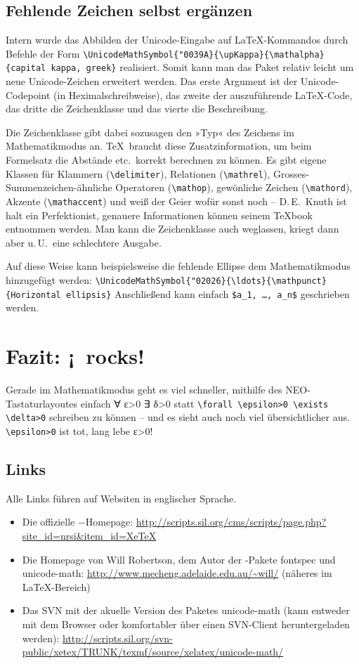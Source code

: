 ﻿\documentclass{scrartcl}
\begin{document}
\subsection{Fehlende Zeichen selbst ergänzen}
Intern wurde das Abbilden der Unicode-Eingabe auf \LaTeX-Kommandos durch Befehle der Form
\verb|\UnicodeMathSymbol{"0039A}{\upKappa}{\mathalpha}{capital kappa, greek}|
realisiert. Somit kann man das Paket relativ leicht um neue Unicode-Zeichen erweitert werden. Das erste Argument ist der Unicode-Codepoint (in Heximalschreibweise), das zweite der auszuführende \LaTeX-Code, das dritte die Zeichenklasse und das vierte die Beschreibung.

Die Zeichenklasse gibt dabei sozusagen den »Typ« des Zeichens im Mathematikmodus an. \TeX\ braucht diese Zusatzinformation, um beim Formelsatz die Abstände etc.\ korrekt berechnen zu können. Es gibt eigene Klassen für Klammern (\verb|\delimiter|), Relationen (\verb|\mathrel|), Grosses-Summenzeichen-ähnliche Operatoren (\verb|\mathop|), gewönliche Zeichen (\verb|\mathord|), Akzente (\verb|\mathaccent|) und weiß der Geier wofür sonst noch – D.\,E.~Knuth ist halt ein Perfektionist, genauere Informationen können seinem \TeX book entnommen werden. Man kann die Zeichenklasse auch weglassen, kriegt dann aber u.\,U.\ eine schlechtere Ausgabe.

Auf diese Weise kann beispielsweise die fehlende Ellipse dem Mathematikmodus hinzugefügt werden: \verb|\UnicodeMathSymbol{"02026}{\ldots}{\mathpunct}{Horizontal ellipsis}|
Anschließend kann einfach \verb|$a_1, …, a_n$| geschrieben werden.

\section*{Fazit: ¡\XeTeX\ rocks!}
Gerade im Mathematikmodus geht es viel schneller, mithilfe des NEO-Tastaturlayoutes einfach ∀ ε>0 ∃ δ>0 statt \verb|\forall \epsilon>0 \exists \delta>0| schreiben zu können – und es sieht auch noch viel übersichtlicher aus. \verb|\epsilon>0| ist tot, lang lebe ε>0!

\subsection*{Links}
Alle Links führen auf Websiten in englischer Sprache.
\begin{itemize}
\item Die offizielle \XeTeX−Homepage: \url{http://scripts.sil.org/cms/scripts/page.php?site_id=nrsi&item_id=XeTeX}
\item Die Homepage von Will Robertson, dem Autor der \XeTeX-Pakete fontspec und unicode-math: \url{http://www.mecheng.adelaide.edu.au/~will/}  (näheres im \LaTeX-Bereich)
\item Das SVN mit der akuelle Version des Paketes unicode-math (kann entweder mit dem Browser oder komfortabler über einen SVN-Client heruntergeladen werden): \url{http://scripts.sil.org/svn-public/xetex/TRUNK/texmf/source/xelatex/unicode-math/}
\end{itemize}
\end{document}
